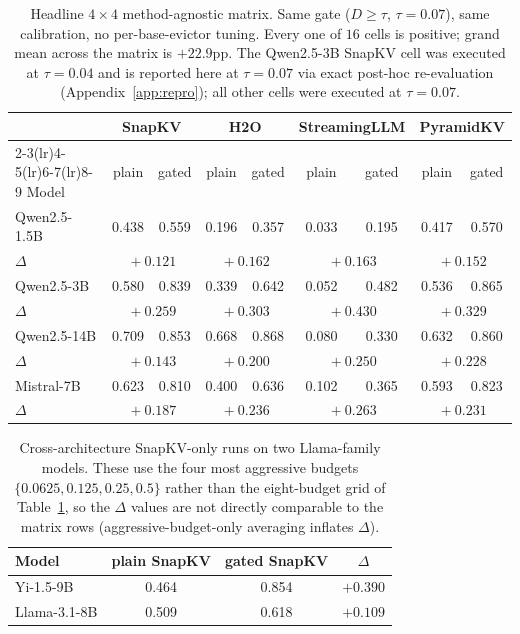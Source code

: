 \documentclass{article} %
\begin{document}
\begin{table}[t]
\centering
\caption{Headline $4 \times 4$ method-agnostic matrix. Same gate ($D \ge \tau$,
$\tau = 0.07$), same calibration, no per-base-evictor tuning. Every one of $16$
cells is positive; grand mean across the matrix is $+22.9$pp. The Qwen2.5-3B
SnapKV cell was executed at $\tau = 0.04$ and is reported here at
$\tau = 0.07$ via exact post-hoc re-evaluation (Appendix~\ref{app:repro});
all other cells were executed at $\tau = 0.07$.}
\label{tab:matrix}
\begin{tabular}{lcccccccc}
\toprule
 & \multicolumn{2}{c}{SnapKV} & \multicolumn{2}{c}{H2O} & \multicolumn{2}{c}{StreamingLLM} & \multicolumn{2}{c}{PyramidKV} \\
\cmidrule(lr){2-3}\cmidrule(lr){4-5}\cmidrule(lr){6-7}\cmidrule(lr){8-9}
Model & plain & gated & plain & gated & plain & gated & plain & gated \\
\midrule
Qwen2.5-1.5B & 0.438 & 0.559 & 0.196 & 0.357 & 0.033 & 0.195 & 0.417 & 0.570 \\
$\Delta$      & \multicolumn{2}{c}{$\!+\!0.121$} & \multicolumn{2}{c}{$\!+\!0.162$} & \multicolumn{2}{c}{$\!+\!0.163$} & \multicolumn{2}{c}{$\!+\!0.152$} \\
\midrule
Qwen2.5-3B   & 0.580 & 0.839 & 0.339 & 0.642 & 0.052 & 0.482 & 0.536 & 0.865 \\
$\Delta$      & \multicolumn{2}{c}{$\!+\!0.259$} & \multicolumn{2}{c}{$\!+\!0.303$} & \multicolumn{2}{c}{$\!+\!0.430$} & \multicolumn{2}{c}{$\!+\!0.329$} \\
\midrule
Qwen2.5-14B  & 0.709 & 0.853 & 0.668 & 0.868 & 0.080 & 0.330 & 0.632 & 0.860 \\
$\Delta$      & \multicolumn{2}{c}{$\!+\!0.143$} & \multicolumn{2}{c}{$\!+\!0.200$} & \multicolumn{2}{c}{$\!+\!0.250$} & \multicolumn{2}{c}{$\!+\!0.228$} \\
\midrule
Mistral-7B    & 0.623 & 0.810 & 0.400 & 0.636 & 0.102 & 0.365 & 0.593 & 0.823 \\
$\Delta$      & \multicolumn{2}{c}{$\!+\!0.187$} & \multicolumn{2}{c}{$\!+\!0.236$} & \multicolumn{2}{c}{$\!+\!0.263$} & \multicolumn{2}{c}{$\!+\!0.231$} \\
\bottomrule
\end{tabular}
\end{table}

\begin{table}[t]
\centering
\caption{Cross-architecture SnapKV-only runs on two Llama-family models.
These use the four most aggressive budgets $\{0.0625, 0.125, 0.25, 0.5\}$
rather than the eight-budget grid of Table~\ref{tab:matrix}, so the
$\Delta$ values are not directly comparable to the matrix rows
(aggressive-budget-only averaging inflates $\Delta$).}
\label{tab:crossarch}
\begin{tabular}{lccc}
\toprule
Model & plain SnapKV & gated SnapKV & $\Delta$ \\
\midrule
Yi-1.5-9B    & 0.464 & 0.854 & $+0.390$ \\
Llama-3.1-8B & 0.509 & 0.618 & $+0.109$ \\
\bottomrule
\end{tabular}
\end{table}
\end{document}
